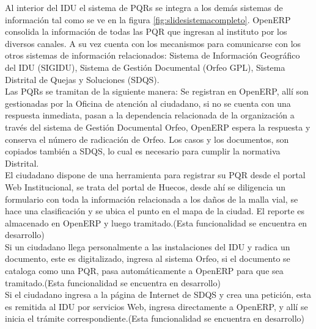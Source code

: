 Al interior del IDU el sistema de PQRs se integra a los demás sistemas de información tal como se ve en la figura \ref{fig:slidesistemacompleto}. OpenERP consolida la 
información de todas las PQR que ingresan al instituto por los diversos canales. A su vez cuenta con los mecanismos para comunicarse con los otros sistemas de información 
relacionados: Sistema de Información Geográfico del IDU (SIGIDU), Sistema de Gestión Documental (Orfeo GPL), Sistema Distrital de 
Quejas y Soluciones (SDQS).\\

Las PQRs se tramitan de la siguiente manera: Se registran en OpenERP, allí son gestionadas por la Oficina de atención al ciudadano,
si no se cuenta con una respuesta inmediata, pasan a la dependencia relacionada de la organización a través del
sistema de Gestión Documental Orfeo, OpenERP espera la respuesta y conserva el número de radicación de Orfeo. Los casos y los documentos, son copiados también 
a SDQS, lo cual es necesario para cumplir la normativa Distrital.\\

El ciudadano dispone de una herramienta para registrar su PQR desde el portal Web Institucional, se trata del portal de Huecos,
desde ahí se diligencia un formulario con toda la información relacionada a los daños de la malla vial, se hace una clasificación y se ubica el 
punto en el mapa de la ciudad. El reporte es almacenado en OpenERP y luego tramitado.(Esta funcionalidad se encuentra en desarrollo)\\

Si un ciudadano llega personalmente a las instalaciones del IDU y radica un documento, este es digitalizado, ingresa al sistema Orfeo, si el 
documento se cataloga como una PQR, pasa automáticamente a OpenERP para que sea tramitado.(Esta funcionalidad se encuentra en desarrollo)\\

Si el ciudadano ingresa a la página de Internet de SDQS y crea una petición, esta es remitida al IDU por servicios Web, ingresa directamente a OpenERP, 
y allí se inicia el trámite correspondiente.(Esta funcionalidad se encuentra en desarrollo)\\

